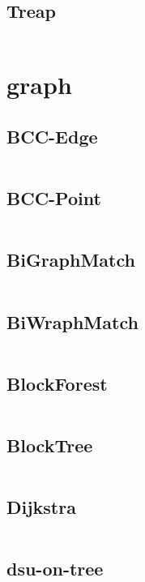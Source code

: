 \documentclass[a4]{article}
\begin{document}
\subsection{Treap}
\inputminted[mathescape,linenos,numbersep=5pt,frame=lines,framesep=2mm]{cpp}{src/ds/Treap.cpp}
\section{graph}
\subsection{BCC-Edge}
\inputminted[mathescape,linenos,numbersep=5pt,frame=lines,framesep=2mm]{cpp}{src/graph/BCC-Edge.cpp}
\subsection{BCC-Point}
\inputminted[mathescape,linenos,numbersep=5pt,frame=lines,framesep=2mm]{cpp}{src/graph/BCC-Point.cpp}
\subsection{BiGraphMatch}
\inputminted[mathescape,linenos,numbersep=5pt,frame=lines,framesep=2mm]{cpp}{src/graph/BiGraphMatch.cpp}
\subsection{BiWraphMatch}
\inputminted[mathescape,linenos,numbersep=5pt,frame=lines,framesep=2mm]{cpp}{src/graph/BiWraphMatch.cpp}
\subsection{BlockForest}
\inputminted[mathescape,linenos,numbersep=5pt,frame=lines,framesep=2mm]{cpp}{src/graph/BlockForest.cpp}
\subsection{BlockTree}
\inputminted[mathescape,linenos,numbersep=5pt,frame=lines,framesep=2mm]{cpp}{src/graph/BlockTree.cpp}
\subsection{Dijkstra}
\inputminted[mathescape,linenos,numbersep=5pt,frame=lines,framesep=2mm]{cpp}{src/graph/Dijkstra.cpp}
\subsection{dsu-on-tree}
\inputminted[mathescape,linenos,numbersep=5pt,frame=lines,framesep=2mm]{cpp}{src/graph/dsu-on-tree.cpp}
\end{document}
